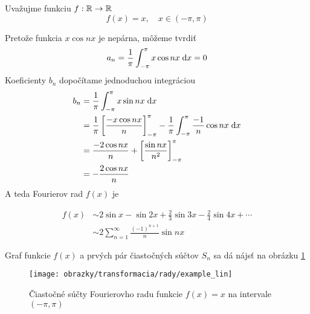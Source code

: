 \begin{priklad}
   Uvažujme funkciu $f:{\mathbb R}\rightarrow{\mathbb R}$
   \begin{equation*}
        f(x) = x, \quad x \in(-\pi,\pi)
   \end{equation*}

    Pretože funkcia $x \cos nx$ je nepárna, môžeme tvrdiť
   \begin{equation*}
        a_n = \frac{1}{\pi} \int_{-\pi}^{\pi} x \cos nx \; \mathrm{d} x =0
   \end{equation*}
    Koeficienty $b_n$ dopočítame jednoduchou integráciou
   \begin{equation*}
   \begin{split}
        b_n &= \frac{1}{\pi} \int_{-\pi}^{\pi} x \sin nx \; \mathrm{d} x \\
        &= \frac{1}{\pi} \left[
            \frac{- x \cos nx}{n}
            \right]_{-\pi}^\pi -
            \frac{1}{\pi} \int_{-\pi}^{\pi} \frac{-1}{n} \cos nx \; \mathrm{d} x  \\
        &=
        \frac{-2 \cos nx}{n} + 
            \left[
                \frac{\sin nx}{n^2}
            \right]_{-\pi}^{\pi} \\
        &= -\frac{2 \cos nx}{n}
   \end{split}
   \end{equation*}
   A teda Fourierov rad  $f(x)$ je
   
    \begin{equation*}
    \begin{split}
        f(x) &\sim 2 \sin x - \sin 2x + \frac{2}{3} \sin 3x - \frac{2}{4}
        \sin 4x + \cdots \\
        &\sim 2\sum_{n=1}^{\infty} \frac{(-1)^{n+1}}{n} \sin nx
    \end{split}
    \end{equation*}
    
    Graf funkcie $f(x)$ a prvých pár čiastočných súčtov $S_n$ sa dá
    nájsť na obrázku \ref{fig:example_lin}

    \begin{figure}[htp]
        \centering
        \texttt{[image: obrazky/transformacia/rady/example\_lin]}
        \caption{Čiastočné súčty Fourierovho radu funkcie $f(x)=x$ na
        intervale $(-\pi,\pi)$}
        \label{fig:example_lin}
    \end{figure}
    \label{priklad:fourier_series_linear}
\end{priklad}


